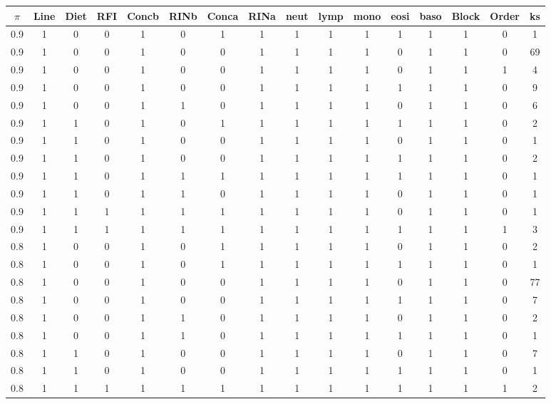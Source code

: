 \documentclass[12pt, letter]{article}\usepackage[]{graphicx}\usepackage[]{color}
\begin{document}
\begin{table}
\centering
{\scriptsize
\begin{tabular}{|c|c|c|c|c|c|c|c|c|c|c|c|c|c|c|c|}
  \hline
$\pi$ & Line & Diet & RFI & Concb & RINb & Conca & RINa & neut & lymp & mono & eosi & baso & Block & Order & ks \\ 
  \hline
0.9 & 1 & 0 & 0 & 1 & 0 & 1 & 1 & 1 & 1 & 1 & 1 & 1 & 1 & 0 & 1 \\ 
  0.9 & 1 & 0 & 0 & 1 & 0 & 0 & 1 & 1 & 1 & 1 & 0 & 1 & 1 & 0 & 69 \\ 
  0.9 & 1 & 0 & 0 & 1 & 0 & 0 & 1 & 1 & 1 & 1 & 0 & 1 & 1 & 1 & 4 \\ 
  0.9 & 1 & 0 & 0 & 1 & 0 & 0 & 1 & 1 & 1 & 1 & 1 & 1 & 1 & 0 & 9 \\ 
  0.9 & 1 & 0 & 0 & 1 & 1 & 0 & 1 & 1 & 1 & 1 & 0 & 1 & 1 & 0 & 6 \\ 
  0.9 & 1 & 1 & 0 & 1 & 0 & 1 & 1 & 1 & 1 & 1 & 1 & 1 & 1 & 0 & 2 \\ 
  0.9 & 1 & 1 & 0 & 1 & 0 & 0 & 1 & 1 & 1 & 1 & 0 & 1 & 1 & 0 & 1 \\ 
  0.9 & 1 & 1 & 0 & 1 & 0 & 0 & 1 & 1 & 1 & 1 & 1 & 1 & 1 & 0 & 2 \\ 
  0.9 & 1 & 1 & 0 & 1 & 1 & 1 & 1 & 1 & 1 & 1 & 1 & 1 & 1 & 0 & 1 \\ 
  0.9 & 1 & 1 & 0 & 1 & 1 & 0 & 1 & 1 & 1 & 1 & 0 & 1 & 1 & 0 & 1 \\ 
  0.9 & 1 & 1 & 1 & 1 & 1 & 1 & 1 & 1 & 1 & 1 & 0 & 1 & 1 & 0 & 1 \\ 
  0.9 & 1 & 1 & 1 & 1 & 1 & 1 & 1 & 1 & 1 & 1 & 1 & 1 & 1 & 1 & 3 \\ 
   \hline
0.8 & 1 & 0 & 0 & 1 & 0 & 1 & 1 & 1 & 1 & 1 & 0 & 1 & 1 & 0 & 2 \\ 
  0.8 & 1 & 0 & 0 & 1 & 0 & 1 & 1 & 1 & 1 & 1 & 1 & 1 & 1 & 0 & 1 \\ 
  0.8 & 1 & 0 & 0 & 1 & 0 & 0 & 1 & 1 & 1 & 1 & 0 & 1 & 1 & 0 & 77 \\ 
  0.8 & 1 & 0 & 0 & 1 & 0 & 0 & 1 & 1 & 1 & 1 & 1 & 1 & 1 & 0 & 7 \\ 
  0.8 & 1 & 0 & 0 & 1 & 1 & 0 & 1 & 1 & 1 & 1 & 0 & 1 & 1 & 0 & 2 \\ 
  0.8 & 1 & 0 & 0 & 1 & 1 & 0 & 1 & 1 & 1 & 1 & 1 & 1 & 1 & 0 & 1 \\ 
  0.8 & 1 & 1 & 0 & 1 & 0 & 0 & 1 & 1 & 1 & 1 & 0 & 1 & 1 & 0 & 7 \\ 
  0.8 & 1 & 1 & 0 & 1 & 0 & 0 & 1 & 1 & 1 & 1 & 1 & 1 & 1 & 0 & 1 \\ 
  0.8 & 1 & 1 & 1 & 1 & 1 & 1 & 1 & 1 & 1 & 1 & 1 & 1 & 1 & 1 & 2 \\ 

\end{tabular}}
\end{table}
\end{document}
